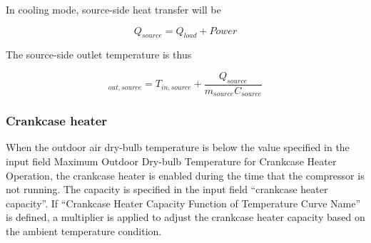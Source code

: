 In cooling mode, source-side heat transfer will be

\begin{equation}
Q_{source} = Q_{load} + Power
\end{equation}

The source-side outlet temperature is thus

\begin{equation}
_{out,source} = T_{in,source} + \frac{Q_{source}}{m_{source}C_{source}}
\end{equation}

\subsubsection{Crankcase heater}

When the outdoor air dry-bulb temperature is below the value specified in the
input field Maximum Outdoor Dry-bulb Temperature for Crankcase Heater Operation,
the crankcase heater is enabled during the time that the compressor is not
running. The capacity is specified in the input field ``crankcase heater
capacity''. If ``Crankcase Heater Capacity Function of Temperature Curve Name'' is
defined, a multiplier is applied to adjust the crankcase heater capacity based
on the ambient temperature condition.
